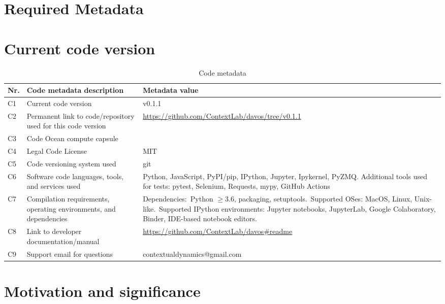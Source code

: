 \documentclass[preprint,12pt,a4paper]{elsarticle}
\begin{document}
\section*{Required Metadata}

\section*{Current code version}


\begin{table}[H]
\begin{tabular}{|l|p{6.5cm}|p{6.5cm}|}
\hline
\textbf{Nr.} & \textbf{Code metadata description} & \textbf{Metadata value} \\
\hline
C1 & Current code version &  v0.1.1 \\
\hline
C2 & Permanent link to code/repository used for this code version & \url{https://github.com/ContextLab/davos/tree/v0.1.1} \\
\hline
C3 & Code Ocean compute capsule & \\
\hline
C4 & Legal Code License & MIT \\
\hline
C5 & Code versioning system used & git \\
\hline
C6 & Software code languages, tools, and services used & Python, JavaScript, PyPI/pip, IPython, Jupyter, Ipykernel, PyZMQ. Additional tools used for tests: pytest, Selenium, Requests, mypy, GitHub Actions \\
\hline
C7 & Compilation requirements, operating environments, and
     dependencies & Dependencies:~Python $\geq 3.6$, packaging, setuptools.~Supported OSes: MacOS, Linux, Unix-like.~Supported IPython environments: Jupyter notebooks, JupyterLab, Google Colaboratory, Binder, IDE-based notebook editors. \\
\hline
C8 & Link to developer documentation/manual & \url{https://github.com/ContextLab/davos\#readme} \\
\hline
C9 & Support email for questions & contextualdynamics@gmail.com \\
\hline
\end{tabular}
\caption{Code metadata}
\label{}
\end{table}

\linenumbers


\section{Motivation and significance}
\end{document}
